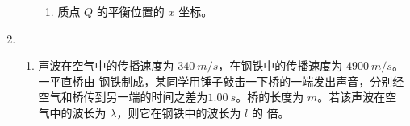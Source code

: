 \begin{enumerate}
\begin{enumerate}
\begin{enumerate}
\item 
质点 $ Q $ 的平衡位置的 $ x $ 坐标。


\end{enumerate}
\begin{figure}[h!]
	\flushright
\begin{subfigure}{0.4\linewidth}
	\centering
	 
	\caption{}\label{2018全国13402a}
\end{subfigure}
\begin{subfigure}{0.4\linewidth}
	\centering
	 
	\caption{}\label{2018全国13402b}
\end{subfigure}
\end{figure}




\end{enumerate}



\item
{}
\begin{enumerate}
	\item
声波在空气中的传播速度为 $ 340 \ m /s $，在钢铁中的传播速度为 $ 4900 \ m /s $。一平直桥由
钢铁制成，某同学用锤子敲击一下桥的一端发出声音，分别经空气和桥传到另一端的时间之差为$ 1.00 \ s $。桥的长度为  \underlinegap  $ m $。若该声波在空气中的波长为 $ \lambda $，则它在钢铁中的波长为 $ l $ 的
 \underlinegap 
倍。





\end{enumerate}
\end{enumerate}
